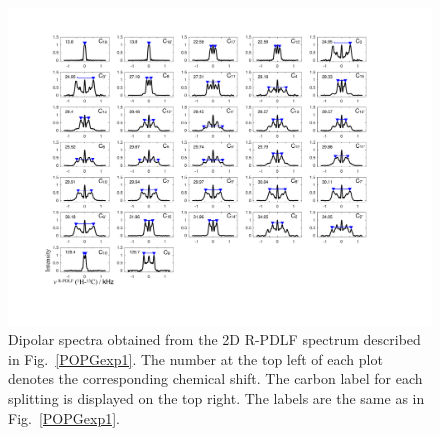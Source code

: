 \documentclass[fleqn,10pt]{wlscirep}
\begin{document}
\begin{figure}[p]
  \includegraphics[width=\textwidth]{Figures/POPG_slices.pdf}
  \caption{Dipolar spectra obtained from the 2D R-PDLF spectrum described in Fig.~\ref{POPGexp1}. The number at the top left of each plot denotes the corresponding chemical shift. The carbon label for each splitting is displayed on the top right. The labels are the same as in Fig.~\ref{POPGexp1}. }
  \label{POPGexp2}
\end{figure}







\pagebreak



\end{document}
